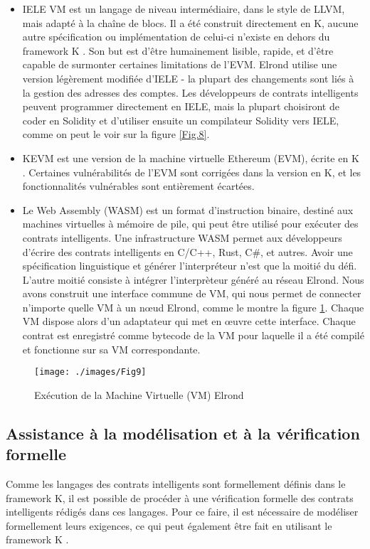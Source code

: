 \documentclass[journal]{IEEEtran}
\begin{document}
\begin{itemize}
  \item IELE VM est un langage de niveau intermédiaire, dans le style de LLVM, mais adapté à la chaîne de blocs. Il a été construit directement en K, aucune autre spécification ou implémentation de celui-ci n'existe en dehors du framework K \cite{40}. Son but est d'être humainement lisible, rapide, et d'être capable de surmonter certaines limitations de l'EVM. Elrond utilise une version légèrement modifiée d'IELE - la plupart des changements sont liés à la gestion des adresses des comptes. Les développeurs de contrats intelligents peuvent programmer directement en IELE, mais la plupart choisiront de coder en Solidity et d'utiliser ensuite un compilateur Solidity vers IELE, comme on peut le voir sur la figure \ref{Fig.8}.  
  \item KEVM est une version de la machine virtuelle Ethereum (EVM), écrite en K \cite{41}. Certaines vulnérabilités de l'EVM sont corrigées dans la version en K, et les fonctionnalités vulnérables sont entièrement écartées.
  \item Le Web Assembly (WASM) est un format d'instruction binaire, destiné aux machines virtuelles à mémoire de pile, qui peut être utilisé pour exécuter des contrats intelligents. Une infrastructure WASM permet aux développeurs d'écrire des contrats intelligents en C/C++, Rust, C\#, et autres.
Avoir une spécification linguistique et générer l'interpréteur n'est que la moitié du défi. L'autre moitié consiste à intégrer l'interprèteur généré au réseau Elrond. Nous avons construit une interface commune de VM, qui nous permet de connecter n'importe quelle VM à un nœud Elrond, comme le montre la figure \ref{Fig.9}. Chaque VM dispose alors d'un adaptateur qui met en œuvre cette interface. Chaque contrat est enregistré comme bytecode de la VM pour laquelle il a été compilé et fonctionne sur sa VM correspondante.
\end{itemize}

\begin{figure}[h]
	\texttt{[image: ./images/Fig9]} %
	\caption{Exécution de la Machine Virtuelle (VM) Elrond} %
	\label{Fig.9} %
\end{figure}

\subsection{Assistance à la modélisation et à la vérification formelle}
Comme les langages des contrats intelligents sont formellement définis dans le framework K, il est possible de procéder à une vérification formelle des contrats intelligents rédigés dans ces langages. Pour ce faire, il est nécessaire de modéliser formellement leurs exigences, ce qui peut également être fait en utilisant le framework K \cite{42}.
\end{document}

